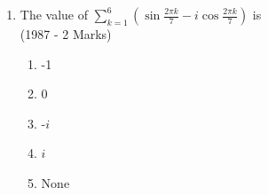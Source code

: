 \documentclass[journal,12pt,twocolumn]{IEEEtran}
\theoremstyle{remark}
\begin{document}
\begin{enumerate}
\item The value of $\sum_{k=1} ^{6} (\sin \frac{2\pi k}{7}-i\cos \frac{2\pi k}{7})$ is                        \\

	\hfill{(1987 - 2 Marks)}
		\begin{multicols}{4}
\begin{enumerate}
	
	\item -1
	\item 0
	\item -$i$
	\item $i$
	\item None
\end{enumerate}
		\end{multicols}

\end{enumerate}

\renewcommand{\thefigure}{\theenumi}
\renewcommand{\thetable}{\theenumi}
\end{document}
